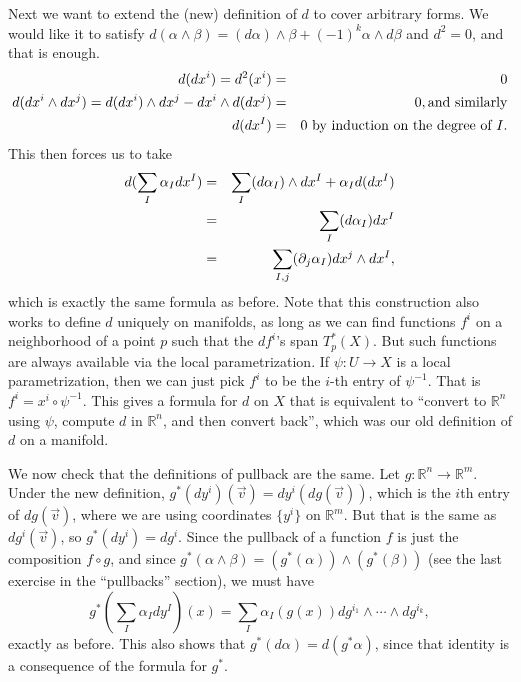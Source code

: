 \documentclass[12pt]{amsbook}
\newcommand{\R}{{\mathbb R}}
\theoremstyle{definition}
\begin{document}
Next we want to extend the (new) definition of $d$ to cover arbitrary forms.
We would like it to satisfy $d(\alpha \wedge \beta) = (d\alpha) \wedge \beta
+ (-1)^k \alpha \wedge d\beta$ and $d^2=0$, and that is enough. 
\begin{eqnarray}
d(dx^i)  =  d^2(x^i) & =& 0 \cr 
d(dx^i \wedge dx^j)  = d(dx^i)\wedge dx^j - dx^i\wedge d(dx^j) & =& 0, 
\hbox{and similarly} \cr 
d(dx^I) & = & 0 \hbox{ by induction on the degree of $I$.} \end{eqnarray}
This then forces us to take
\begin{eqnarray}
d (\sum_I \alpha_I dx^I)  &=& \sum_I (d \alpha_I) \wedge dx^I + \alpha_I d(dx^I) \cr & =& \sum_I (d\alpha_I) dx^I \cr 
& =& \sum_{I,j} (\partial_j \alpha_I) dx^j \wedge dx^I,  
\end{eqnarray}
which is exactly the same formula as before. 
Note that this construction also works to define $d$
uniquely on manifolds, as 
long as we can find functions $f^i$ on a neighborhood of a point $p$ 
such that the $df^i$'s span $T^*_p(X)$. But such functions are always available
via the local parametrization. If $\psi:U \to X$ is a local parametrization,
then we can just pick $f^i$ to be the $i$-th entry of $\psi^{-1}$. That is 
$f^i=x^i \circ \psi^{-1}$. This gives a formula for $d$ on $X$ that is equivalent
to ``convert to $\R^n$ using $\psi$, compute $d$ in $\R^n$, and then convert
back'', which was our old definition of $d$ on a manifold. 

We now check that the definitions of pullback are the same. Let 
$g: \R^n \to \R^m$.  
Under the new definition, $g^*(dy^i) (\vec v) = dy^i(dg(\vec v))$, which 
is the $i$th entry of $dg(\vec v)$, where we are using coordinates $\{y^i\}$
on $\R^m$. But that is the same as $dg^i(\vec v)$,
so $g^*(dy^i)=dg^i$. Since the pullback of a function $f$ is just the 
composition $f\circ g$,
and since $g^*(\alpha \wedge \beta)=(g^*(\alpha)) \wedge (g^*(\beta))$ (see
the last exercise in the ``pullbacks'' section), we must have
$$ g^*(\sum_I \alpha_I dy^I)(x) = \sum_I \alpha_I(g(x)) dg^{i_1}\wedge
\cdots \wedge dg^{i_k},$$
exactly as before.  This also shows that $g^*(d\alpha) = d(g^*\alpha)$, since
that identity is a consequence of the formula for $g^*$.
\end{document}
